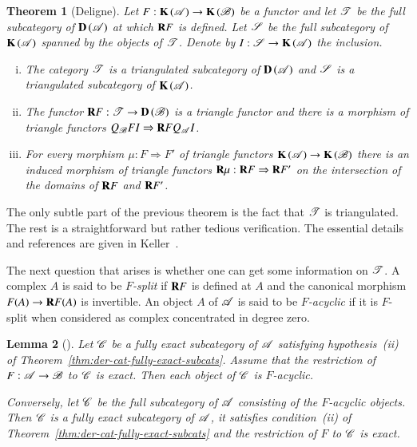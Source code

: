 \documentclass[1p]{elsarticle}
\theoremstyle{mythm}
\newtheorem{Thm}{Theorem}[section]
\newtheorem{Lem}[Thm]{Lemma}
\theoremstyle{mydef}
\begin{document}
\begin{Thm}[Deligne]
  Let $F: \operatorname{\mathbf{K}}{(\operatorname{\mathscr{A}})} \to \operatorname{\mathbf{K}}{(\operatorname{\mathscr{B}})}$ be a functor and let $\operatorname{\mathscr{T}}$
  be the full subcategory of $\operatorname{\mathbf{D}}{(\operatorname{\mathscr{A}})}$ at which $\operatorname{\mathbf{R}}\!F$ is
  defined. Let $\operatorname{\mathscr{S}}$ be the full subcategory of $\operatorname{\mathbf{K}}{(\operatorname{\mathscr{A}})}$ spanned
  by the objects of $\operatorname{\mathscr{T}}$. Denote by $I: \operatorname{\mathscr{S}} \to \operatorname{\mathbf{K}}{(\operatorname{\mathscr{A}})}$ the
  inclusion.
  \begin{enumerate}[(i)]
    \item
      The category $\operatorname{\mathscr{T}}$ is a triangulated subcategory of
      $\operatorname{\mathbf{D}}{(\operatorname{\mathscr{A}})}$ and $\operatorname{\mathscr{S}}$ is a triangulated subcategory of
      $\operatorname{\mathbf{K}}{(\operatorname{\mathscr{A}})}$.

    \item
      The functor $\operatorname{\mathbf{R}}\!F: \operatorname{\mathscr{T}} \to \operatorname{\mathbf{D}}{(\operatorname{\mathscr{B}})}$ is a triangle
      functor and there is a morphism of triangle functors
      $Q_{\operatorname{\mathscr{B}}} FI \Rightarrow \operatorname{\mathbf{R}}\!F Q_{\operatorname{\mathscr{A}}} I$.
      
    \item
      For every morphism $\mu: F \Rightarrow F'$ of triangle functors
      $\operatorname{\mathbf{K}}{(\operatorname{\mathscr{A}})} \to \operatorname{\mathbf{K}}{(\operatorname{\mathscr{B}})}$
      there is an induced morphism of triangle functors $\operatorname{\mathbf{R}}\!\mu:
      \operatorname{\mathbf{R}}\!F \Rightarrow \operatorname{\mathbf{R}}\!F'$ on the intersection of the domains
      of $\operatorname{\mathbf{R}}\!F$ and $\operatorname{\mathbf{R}}\!F'$.
  \end{enumerate}
\end{Thm}

The only subtle part of the previous theorem is the fact that $\operatorname{\mathscr{T}}$
is triangulated. The rest is a straightforward but rather tedious
verification. The essential details and references are given in
Keller~\cite[\S{}13]{MR1421815}.

The next question that arises is whether one can get some information
on $\operatorname{\mathscr{T}}$. A complex $A$ is said to be \emph{$F$-split} if $\operatorname{\mathbf{R}}\!F$ is
defined at $A$ and the canonical morphism $F(A) \to \operatorname{\mathbf{R}}\!F(A)$ is
invertible. An object $A$ of $\operatorname{\mathscr{A}}$ is said to be \emph{$F$-acyclic} if it
is $F$-split when considered as complex concentrated in degree zero.

\begin{Lem}[{\cite[15.1, 15.3]{MR1421815}}]
  \label{lem:cat-of-f-acyclic-obj}
  Let $\operatorname{\mathscr{C}}$ be a fully exact subcategory of $\operatorname{\mathscr{A}}$ satisfying
  hypothesis~(ii) of Theorem~\ref{thm:der-cat-fully-exact-subcats}.
  Assume that the restriction of $F: \operatorname{\mathscr{A}} \to
  \operatorname{\mathscr{B}}$ to $\operatorname{\mathscr{C}}$ is exact. Then each object of $\operatorname{\mathscr{C}}$
  is $F$-acyclic.
  
  Conversely, let $\operatorname{\mathscr{C}}$ be the full subcategory of $\operatorname{\mathscr{A}}$
  consisting of the $F$-acyclic objects.
  Then $\operatorname{\mathscr{C}}$ is a fully exact
  subcategory of $\operatorname{\mathscr{A}}$, it satisfies condition~(ii) of
  Theorem~\ref{thm:der-cat-fully-exact-subcats} and the restriction of
  $F$ to $\operatorname{\mathscr{C}}$ is exact.
\end{Lem}
\end{document}
